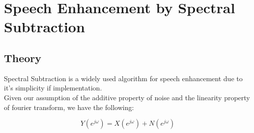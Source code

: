 \chapter{Speech Enhancement by Spectral Subtraction}

\section{Theory}
Spectral Subtraction is a widely used algorithm for speech enhancement due to it's simplicity if implementation.\\ 

Given our assumption of the additive property of noise and the linearity property of fourier transform, we have the following: 

$$ Y(e^{j\omega}) = X(e^{j\omega}) + N(e^{j\omega}) $$